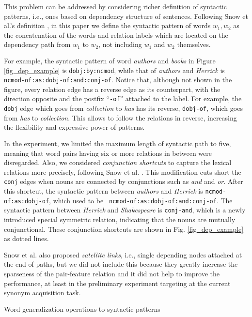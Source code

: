 \documentclass[english]{jnlp_1.4}
\begin{document}
This problem can be addressed by considering richer definition of
syntactic patterns, i.e., ones based on dependency structure of
sentences. Following Snow et al.'s definition \cite{Snow:04}, in this
paper we define the syntactic pattern of words $w_1, w_2$ as the
concatenation of the words and relation labels which are located on
the dependency path from $w_1$ to $w_2$, not including $w_1$ and $w_2$
themselves.

For example, the syntactic pattern of word \textit{authors} and {\em
books} in Figure \ref{fig_dep_example} is {\tt dobj:by:ncmod}, while
that of \textit{authors} and \textit{Herrick} is {\tt
ncmod-of:as:dobj-of:and:conj-of}. Notice that, although not shown in
the figure, every relation edge has a reverse edge as its counterpart,
with the direction opposite and the postfix ``{\tt -of}'' attached to
the label. For example, the {\tt dobj} edge which goes from {\em
collection} to \textit{has} has its reverse, {\tt dobj-of}, which goes
from \textit{has} to \textit{collection}. This allows to follow the
relations in reverse, increasing the flexibility and expressive power
of patterns.

In the experiment, we limited the maximum length of syntactic path to
five, meaning that word pairs having six or more relations in between
were disregarded. Also, we considered \textit{conjunction shortcuts} to
capture the lexical relations more precisely, following Snow et
al. \cite{Snow:04}. This modification cuts short the {\tt conj} edges
when nouns are connected by conjunctions such as \textit{and} and {\em
or}. After this shortcut, the syntactic pattern between \textit{authors}
and \textit{Herrick} is {\tt ncmod-of:as:dobj-of}, which used to be {\tt
ncmod-of:as:dobj-of:and:conj-of}. The syntactic pattern between {\em
Herrick} and \textit{Shakespeare} is {\tt conj-and}, which is a newly
introduced special symmetric relation, indicating that the nouns are
mutually conjunctional. These conjunction shortcuts are shown in
Fig. \ref{fig_dep_example} as dotted lines.

Snow et al. also proposed \textit{satellite links}, i.e., single
depending nodes attached at the end of paths, but we did not include
this because they greatly increase the sparseness of the pair-feature
relation and it did not help to improve the performance, at least in
the preliminary experiment targeting at the current synonym
acquisition task.


\begin{table}[b]
\caption{Word generalization operations to syntactic patterns}
\label{tab_rep_oprs}

\end{table}
\end{document}
